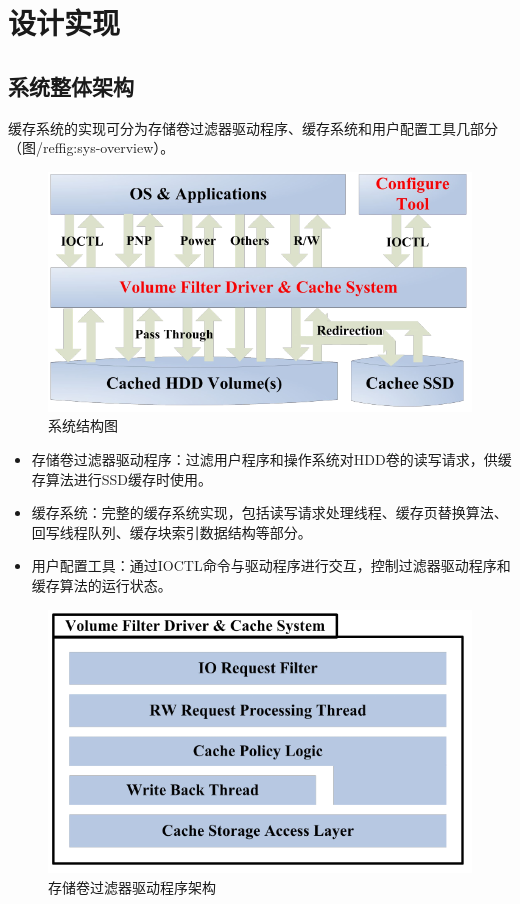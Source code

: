 
\chapter{设计实现}
\label{cha:mainmatter}

\section{系统整体架构}
\label{sec:system_overview}

缓存系统的实现可分为存储卷过滤器驱动程序、缓存系统和用户配置工具几部分（图/ref{fig:sys-overview}）。

\begin{figure}[htb]
\centering
\includegraphics[width=0.6\linewidth]{./graph/sys-overview}
\caption{系统结构图}
\label{fig:sys-overview}
\end{figure}

\begin{itemize}
\item
存储卷过滤器驱动程序：过滤用户程序和操作系统对HDD卷的读写请求，供缓存算法进行SSD缓存时使用。
\item
缓存系统：完整的缓存系统实现，包括读写请求处理线程、缓存页替换算法、回写线程队列、缓存块索引数据结构等部分。
\item
用户配置工具：通过IOCTL命令与驱动程序进行交互，控制过滤器驱动程序和缓存算法的运行状态。
\end{itemize}

\begin{figure}[htb]
\centering
\includegraphics[width=0.6\linewidth]{./graph/sys-flt-arch}
\caption{存储卷过滤器驱动程序架构}
\label{fig:sys-flt-arch}
\end{figure}

